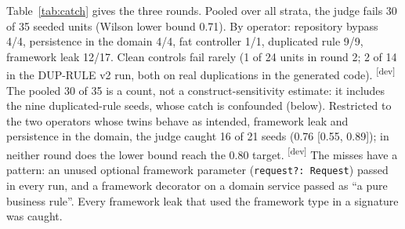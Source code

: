 \documentclass[10pt,a4paper]{article}
\newcommand{\devset}{\textsuperscript{\textsf{\tiny[dev]}}}
\begin{document}
Table~\ref{tab:catch} gives the three rounds. Pooled over all strata, the judge fails 30 of 35 seeded units
(Wilson lower bound 0.71). By operator: repository bypass 4/4, persistence in the domain 4/4, fat controller 1/1,
duplicated rule 9/9, framework leak 12/17. Clean controls fail rarely (1 of 24 units in round 2; 2 of 14 in the
DUP-RULE v2 run, both on real duplications in the generated code). \devset{}
The pooled 30 of 35 is a count, not a construct-sensitivity estimate: it includes the nine duplicated-rule seeds,
whose catch is confounded (below). Restricted to the two operators whose twins behave as intended, framework leak and
persistence in the domain, the judge caught 16 of 21 seeds (0.76 [0.55, 0.89]); in neither round does the lower bound
reach the 0.80 target. \devset{}
The misses have a pattern: an unused optional framework parameter (\texttt{request?: Request}) passed in every run,
and a framework decorator on a domain service passed as ``a pure business rule''. Every framework leak that used the
framework type in a signature was caught. %
\end{document}

